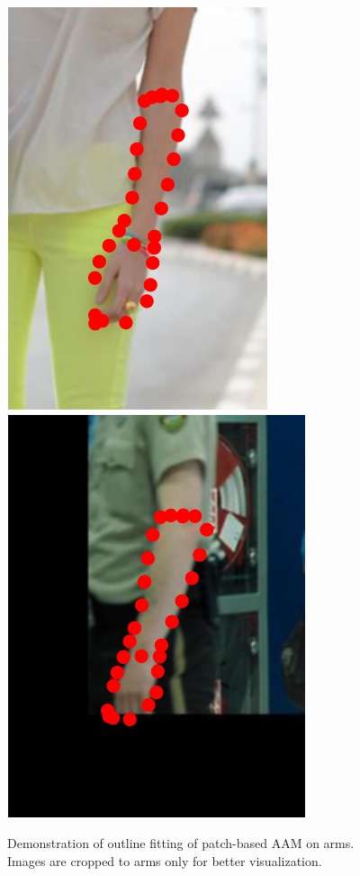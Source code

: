\begin{figure}
    \includegraphics[height=\ofh]{resources/Annotation_Correction/Suplementory_Meterial/ExFit/0043}
    \hfill
    \includegraphics[height=\ofh]{resources/Annotation_Correction/Suplementory_Meterial/ExFit/0044}
    \caption{Demonstration of outline fitting of patch-based AAM on arms. Images are cropped to arms only for better visualization.}
    \label{fig:outline_fitting}
\end{figure}

